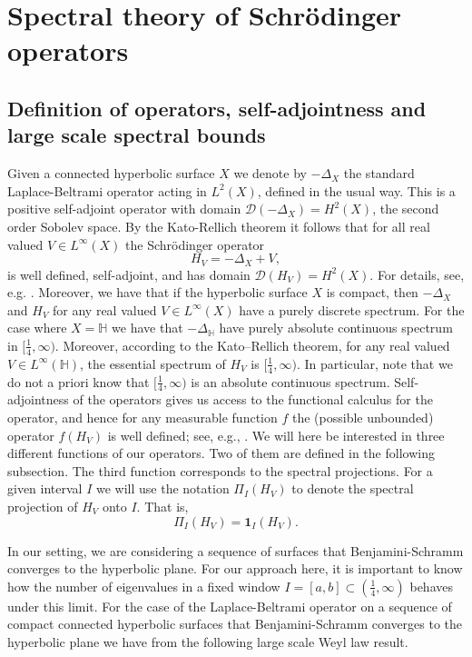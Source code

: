 \documentclass[11pt,twoside,reqno]{amsart}
\newcommand{\bH}{\mathbb{H}}
\newcommand{\1}{\mathrm{\mathbf{1}}}
\numberwithin{equation}{section}
\theoremstyle{plain}
\theoremstyle{definition}
\theoremstyle{remark}
\begin{document}
\section{Spectral theory of Schr\"odinger operators}\label{SEC:Spectral_theory_schr}

\subsection{Definition of operators, self-adjointness and large scale spectral bounds}\label{SEC:Kernels_def_selfadj}

Given a connected hyperbolic surface $X$ we denote by $-\Delta_X$ the standard Laplace-Beltrami operator acting in $L^2(X)$, defined in the usual way. This is a positive self-adjoint operator with domain $\mathcal{D}(-\Delta_X) = H^2(X)$, the second order Sobolev space. By the Kato-Rellich theorem it follows that for all real valued $V\in L^\infty(X)$ the Schr\"odinger operator 
\begin{equation*}
    H_V = -\Delta_X +V,
\end{equation*}
 is well defined, self-adjoint, and has domain $\mathcal{D}(H_V) = H^2(X)$. For details, see, e.g. \cite{ReedSimonII}. Moreover, we have that if the hyperbolic surface $X$ is compact, then $-\Delta_X$ and $H_V$ for any real valued $V\in L^\infty(X)$ have a purely discrete spectrum. For the case where $X=\bH$ we have that $-\Delta_\bH$ have purely absolute continuous spectrum in $[\frac{1}{4},\infty)$. Moreover, according to the Kato–Rellich theorem, for any real valued $V \in L^\infty(\bH)$, the essential spectrum of $H_V$ is $[\frac{1}{4},\infty)$. In particular, note that we do not a priori know that $[\frac{1}{4},\infty)$ is an absolute continuous spectrum. Self-adjointness of the operators gives us access to the functional calculus for the operator, and hence for any measurable function $f$ the (possible unbounded) operator $f(H_V)$ is well defined; see, e.g., \cite{ReedSimonI}. We will here be interested in three different functions of our operators. Two of them are defined in the following subsection. The third function corresponds to the spectral projections. For a given interval $I$ we will use the notation $\Pi_I(H_V)$ to denote the spectral projection of $H_V$ onto $I$. That is,
\begin{equation*}
    \Pi_I(H_V) = \boldsymbol{1}_I(H_V).
\end{equation*}

In our setting, we are considering a sequence of surfaces that Benjamini-Schramm converges to the hyperbolic plane. For our approach here, it is important to know how the number of eigenvalues in a fixed window $I = [a,b]\subset(\frac{1}{4},\infty)$ behaves under this limit. For the case of the Laplace-Beltrami operator on a sequence of compact connected hyperbolic surfaces that Benjamini-Schramm converges to the hyperbolic plane we have from \cite[Lemma 9.1]{lemassonQuantumErgodicityBenjaminiSchramm2017} the following large scale Weyl law result.     
    
\end{document}
